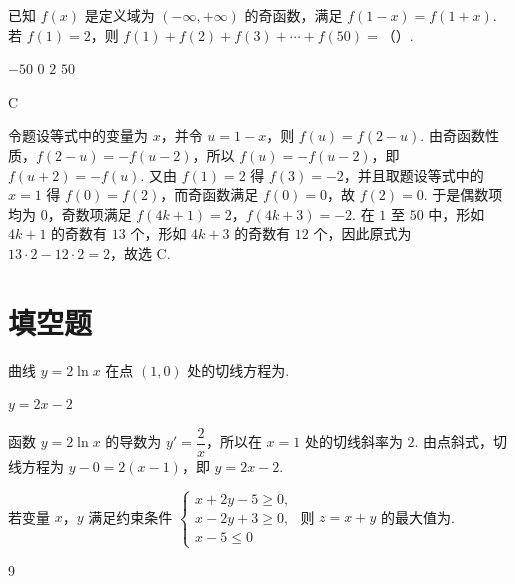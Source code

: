 \begin{problem}
已知 \(f(x)\) 是定义域为 \((-\infty,+\infty)\) 的奇函数，满足 \(f(1-x)=f(1+x)\). 若 \(f(1)=2\)，则 \(f(1)+f(2)+f(3)+\cdots+f(50)=\)（\quad）.

\choices
    {\(-50\)}
    {\(0\)}
    {\(2\)}
    {\(50\)}
\end{problem}

\begin{answer}
C
\end{answer}

\begin{solution}
令题设等式中的变量为 \(x\)，并令 \(u=1-x\)，则 \(f(u)=f(2-u)\). 由奇函数性质，\(f(2-u)=-f(u-2)\)，所以 \(f(u)=-f(u-2)\)，即 \(f(u+2)=-f(u)\). 又由 \(f(1)=2\) 得 \(f(3)=-2\)，并且取题设等式中的 \(x=1\) 得 \(f(0)=f(2)\)，而奇函数满足 \(f(0)=0\)，故 \(f(2)=0\). 于是偶数项均为 \(0\)，奇数项满足 \(f(4k+1)=2\)，\(f(4k+3)=-2\). 在 \(1\) 至 \(50\) 中，形如 \(4k+1\) 的奇数有 \(13\) 个，形如 \(4k+3\) 的奇数有 \(12\) 个，因此原式为 \(13\cdot2-12\cdot2=2\)，故选 C.
\end{solution}

\section{填空题}

\begin{problem}
曲线 \(y=2\ln x\) 在点 \((1,0)\) 处的切线方程为\fillinblank{}.
\end{problem}

\begin{answer}
\(y=2x-2\)
\end{answer}

\begin{solution}
函数 \(y=2\ln x\) 的导数为 \(y'=\dfrac2x\)，所以在 \(x=1\) 处的切线斜率为 \(2\). 由点斜式，切线方程为 \(y-0=2(x-1)\)，即 \(y=2x-2\).
\end{solution}

\begin{problem}
若变量 \(x\)，\(y\) 满足约束条件
\(\begin{cases}
x+2y-5\ge0,\\
x-2y+3\ge0,\\
x-5\le0
\end{cases}\)
则 \(z=x+y\) 的最大值为\fillinblank{}.
\end{problem}

\begin{answer}
9
\end{answer}

